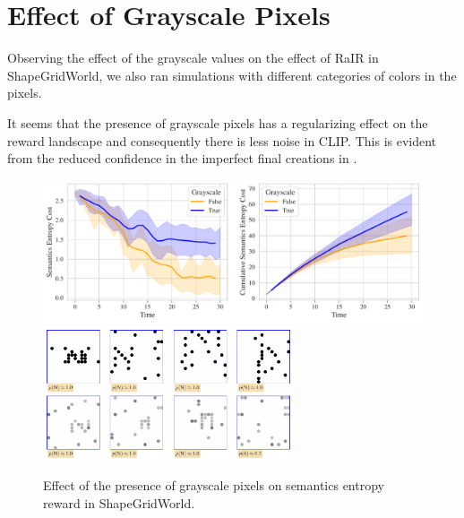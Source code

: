 \section{Effect of Grayscale Pixels}
\label{sec:sgw-grayscale}



Observing the effect of the grayscale values on the effect of RaIR in ShapeGridWorld, we also ran simulations with different categories of colors in the pixels.

It seems that the presence of grayscale pixels has a regularizing effect on the reward landscape and consequently there is less noise in CLIP.
This is evident from the reduced confidence in the imperfect final creations in .

\begin{figure}[h]
    \centering
    \includegraphics[width=\textwidth]{images/mode_comparison_sgw.pdf}
    \vspace{12pt}
    \includegraphics[width=0.66\textwidth]{images/mode_samples_sgw.pdf}
    \caption{Effect of the presence of grayscale pixels on semantics entropy reward in ShapeGridWorld.}
    \label{fig:mode-sgw}
\end{figure}

